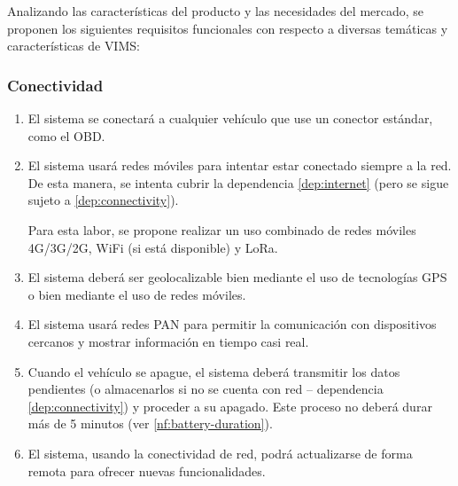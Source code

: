 Analizando las características del producto y las necesidades del mercado, se
proponen los siguientes requisitos funcionales con respecto a diversas temáticas
y características de \ac{VIMS}:

\subsubsection{Conectividad}
\begin{enumerate}[label=\textbf{\texttt{RF-\arabic*}}]
  \item\label{req:connectivity} El sistema se conectará a cualquier vehículo que use
        un conector estándar, como el \ac{OBD}.
  \item\label{req:network} El sistema usará redes móviles para intentar
        estar conectado siempre a la red. De esta manera, se intenta cubrir la dependencia
        \ref{dep:internet} (pero se sigue sujeto a \ref{dep:connectivity}).

        Para esta labor, se propone realizar un uso combinado de redes móviles 4G/3G/2G,
        WiFi (si está disponible) y LoRa.
  \item\label{req:gps} El sistema deberá ser geolocalizable bien mediante el uso
        de tecnologías GPS o bien mediante el uso de redes móviles.
  \item\label{req:bt} El sistema usará redes \ac{PAN} para
        permitir la comunicación con dispositivos cercanos y mostrar información en
        tiempo casi real.
  \item\label{req:start-stop} Cuando el vehículo se apague,
        el sistema deberá transmitir los datos pendientes (o 
        almacenarlos si no se cuenta con red -- dependencia \ref{dep:connectivity})
        y proceder a su apagado. Este proceso no deberá durar más de 5 minutos (ver
        \ref{nf:battery-duration}).
  \item\label{req:ota} El sistema, usando la conectividad de red, podrá actualizarse
        de forma remota para ofrecer nuevas funcionalidades.
\end{enumerate}

